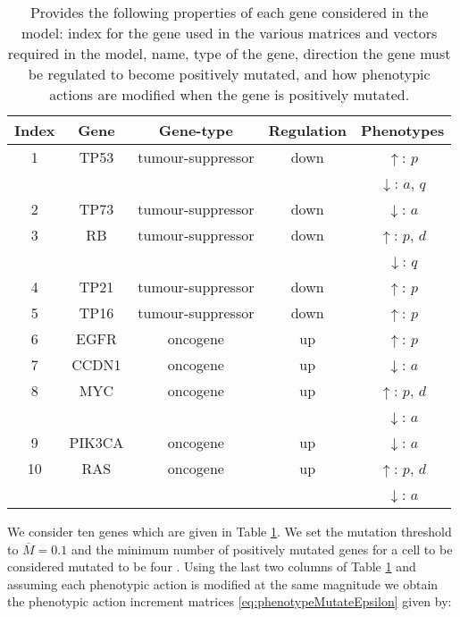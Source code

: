 \documentclass[\main/thesis.tex]{subfiles}
\begin{document}
\begin{table}[H]
\centering
\begin{tabular}{| c c c c c |}
	\hline
	Index & Gene & Gene-type & Regulation & Phenotypes \\
	\hline\hline
	1 & TP53 & tumour-suppressor & down & $\uparrow$: $p$ \\
	 & & & & $\downarrow$: $a$, $q$ \\
	\hline
	2 & TP73 & tumour-suppressor & down & $\downarrow$: $a$ \\
	\hline
	3 & RB & tumour-suppressor & down & $\uparrow$: $p$, $d$ \\
	 & & & & $\downarrow$: $q$ \\
	\hline
	4 & TP21 & tumour-suppressor & down & $\uparrow$: $p$ \\
	\hline
	5 & TP16 & tumour-suppressor & down & $\uparrow$: $p$ \\
	\hline
	6 & EGFR & oncogene & up & $\uparrow$: $p$ \\
	\hline
	7 & CCDN1 & oncogene & up & $\downarrow$: $a$ \\
	\hline
	8 & MYC & oncogene & up & $\uparrow$: $p$, $d$\\
	 & & & & $\downarrow$: $a$ \\
	\hline
	9 & PIK3CA & oncogene & up & $\downarrow$: $a$ \\
	\hline
	10 & RAS & oncogene & up & $\uparrow$: $p$, $d$ \\
	 & & & & $\downarrow$: $a$ \\
	\hline
\end{tabular}
\caption{Provides the following properties of each gene considered in the model: index for the gene used in the various matrices and vectors required in the model, name, type of the gene, direction the gene must be regulated to become positively mutated, and how phenotypic actions are modified when the gene is positively mutated.}
\label{table:genes}
\end{table}
We consider ten genes which are given in Table \ref{table:genes}. We set the mutation threshold to $\overline{M} {=} 0.1$ and the minimum number of positively mutated genes for a cell to be considered mutated to be four \cite{Anandakrishnan}. Using the last two columns of Table \ref{table:genes} and assuming each phenotypic action is modified at the same magnitude we obtain the phenotypic action increment matrices \eqref{eq:phenotypeMutateEpsilon} given by:
\end{document}
